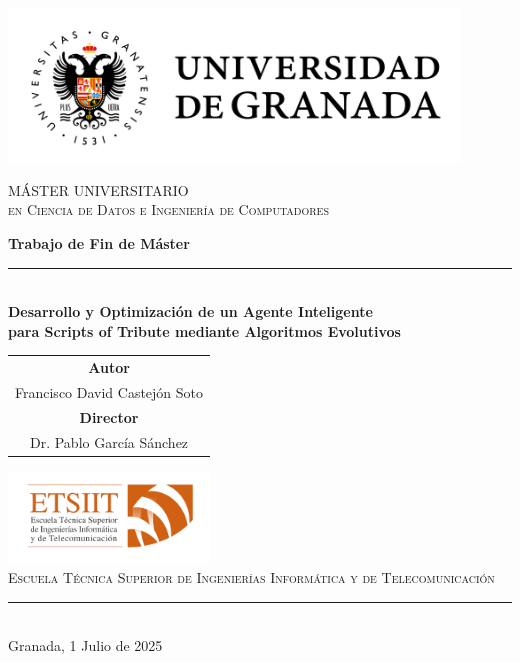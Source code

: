 \begin{titlepage}
	\thispagestyle{empty}

	\centering
	\includegraphics[width=0.9\textwidth]{logos/logo_ugr.jpg}
	\vspace{1.0cm}

	{\rmfamily\textsc{\Large MÁSTER UNIVERSITARIO}}\\[0.2cm]
	{\rmfamily\textsc{\large en Ciencia de Datos e Ingeniería de Computadores}}
	\vspace{1.5cm}

	\vfill

	{\Huge\bfseries Trabajo de Fin de Máster}\\[0.5cm]
	\rule{\textwidth}{2pt}\\[0.5cm]
	{\Large\bfseries Desarrollo y Optimización de un Agente Inteligente \\
	para Scripts of Tribute mediante Algoritmos Evolutivos}
	\vspace{1.5cm}

	\vfill

	\begin{tabular}{@{}c@{}}
		\textbf{\large Autor}         \\[0.3cm]
		Francisco David Castejón Soto \\[1cm]
		\textbf{\large Director}      \\[0.3cm]
		Dr. Pablo García Sánchez
	\end{tabular}

	\vfill

	\includegraphics[width=0.4\textwidth]{logos/etsiit_logo.png}\\[0.3cm]
	{\rmfamily\textsc{\footnotesize Escuela Técnica Superior de Ingenierías Informática y de Telecomunicación}}\\
	\rule{0.1\textwidth}{0.5pt}\\[0.3cm]
	{\large Granada, 1 Julio de 2025}

\end{titlepage}